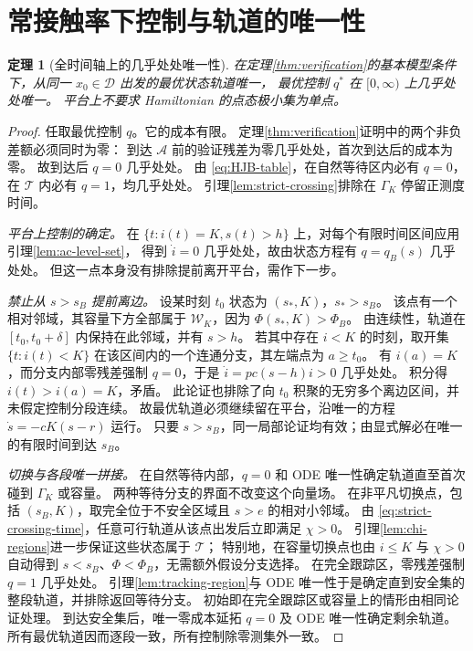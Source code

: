 \documentclass[11pt,a4paper,UTF8]{ctexart}
\newtheorem{theorem}{定理}[section]
\theoremstyle{definition}
\newcommand{\Acal}{\mathcal A}
\newcommand{\Dcal}{\mathcal D}
\begin{document}
\section{常接触率下控制与轨道的唯一性}
\label{sec:constant-uniqueness}
\begin{theorem}[全时间轴上的几乎处处唯一性]
\label{thm:unique-q}
在定理\ref{thm:verification}的基本模型条件下，从同一 $x_0\in\Dcal$ 出发的最优状态轨道唯一，
最优控制 $q^*$ 在 $[0,\infty)$ 上几乎处处唯一。
平台上不要求 Hamiltonian 的点态极小集为单点。
\end{theorem}
\begin{proof}
任取最优控制 $q$。它的成本有限。
定理\ref{thm:verification}证明中的两个非负差额必须同时为零：
到达 $\Acal$ 前的验证残差为零几乎处处，首次到达后的成本为零。
故到达后 $q=0$ 几乎处处。
由 \eqref{eq:HJB-table}，在自然等待区内必有 $q=0$，在 $\mathcal T$ 内必有 $q=1$，均几乎处处。
引理\ref{lem:strict-crossing}排除在 $\Gamma_K$ 停留正测度时间。

\emph{平台上控制的确定。}
在 $\{t:i(t)=K,s(t)>h\}$ 上，对每个有限时间区间应用引理\ref{lem:ac-level-set}，
得到 $\dot i=0$ 几乎处处，故由状态方程有 $q=q_B(s)$ 几乎处处。
但这一点本身没有排除提前离开平台，需作下一步。

\emph{禁止从 $s>s_B$ 提前离边。}
设某时刻 $t_0$ 状态为 $(s_*,K)$，$s_*>s_B$。
该点有一个相对邻域，其容量下方全部属于 $\mathcal W_K$，因为 $\Phi(s_*,K)>\Phi_B$。
由连续性，轨道在 $[t_0,t_0+\delta]$ 内保持在此邻域，并有 $s>h$。
若其中存在 $i<K$ 的时刻，取开集 $\{t:i(t)<K\}$ 在该区间内的一个连通分支，其左端点为 $a\ge t_0$。
有 $i(a)=K$，而分支内部零残差强制 $q=0$，于是 $\dot i=pc(s-h)i>0$ 几乎处处。
积分得 $i(t)>i(a)=K$，矛盾。
此论证也排除了向 $t_0$ 积聚的无穷多个离边区间，并未假定控制分段连续。
故最优轨道必须继续留在平台，沿唯一的方程 $\dot s=-cK(s-r)$ 运行。
只要 $s>s_B$，同一局部论证均有效；由显式解必在唯一的有限时间到达 $s_B$。

\emph{切换与各段唯一拼接。}
在自然等待内部，$q=0$ 和 ODE 唯一性确定轨道直至首次碰到 $\Gamma_K$ 或容量。
两种等待分支的界面不改变这个向量场。
在非平凡切换点，包括 $(s_B,K)$，取完全位于不安全区域且 $s>e$ 的相对小邻域。
由 \eqref{eq:strict-crossing-time}，任意可行轨道从该点出发后立即满足 $\chi>0$。
引理\ref{lem:chi-regions}进一步保证这些状态属于 $\mathcal T$；
特别地，在容量切换点也由 $i\le K$ 与 $\chi>0$ 自动得到 $s<s_B$、$\Phi<\Phi_B$，无需额外假设分支选择。
在完全跟踪区，零残差强制 $q=1$ 几乎处处。
引理\ref{lem:tracking-region}与 ODE 唯一性于是确定直到安全集的整段轨道，并排除返回等待分支。
初始即在完全跟踪区或容量上的情形由相同论证处理。
到达安全集后，唯一零成本延拓 $q=0$ 及 ODE 唯一性确定剩余轨道。
所有最优轨道因而逐段一致，所有控制除零测集外一致。
\end{proof}
\end{document}
